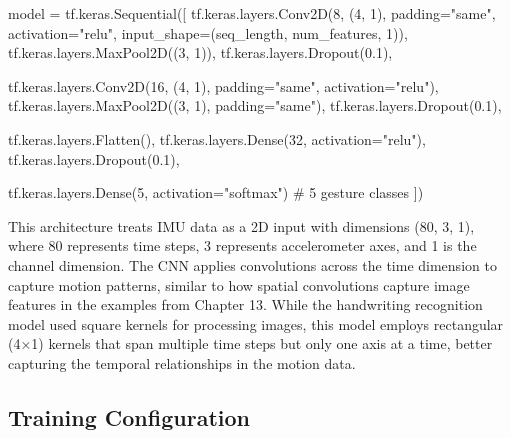 \documentclass[
  9pt,
  letterpaper,
  abstract,
  titlepage]{scrbook}
\newenvironment{Shaded}{\begin{snugshade}}{\end{snugshade}}
\newcommand{\CommentTok}[1]{\textcolor[rgb]{0.37,0.37,0.37}{#1}}
\newcommand{\DecValTok}[1]{\textcolor[rgb]{0.68,0.00,0.00}{#1}}
\newcommand{\FloatTok}[1]{\textcolor[rgb]{0.68,0.00,0.00}{#1}}
\newcommand{\NormalTok}[1]{\textcolor[rgb]{0.00,0.23,0.31}{#1}}
\newcommand{\OperatorTok}[1]{\textcolor[rgb]{0.37,0.37,0.37}{#1}}
\newcommand{\StringTok}[1]{\textcolor[rgb]{0.13,0.47,0.30}{#1}}
\begin{document}
\begin{Shaded}
\begin{Highlighting}[]
\NormalTok{model }\OperatorTok{=}\NormalTok{ tf.keras.Sequential([}
\NormalTok{    tf.keras.layers.Conv2D(}\DecValTok{8}\NormalTok{, (}\DecValTok{4}\NormalTok{, }\DecValTok{1}\NormalTok{), padding}\OperatorTok{=}\StringTok{"same"}\NormalTok{, activation}\OperatorTok{=}\StringTok{"relu"}\NormalTok{,}
\NormalTok{                           input\_shape}\OperatorTok{=}\NormalTok{(seq\_length, num\_features, }\DecValTok{1}\NormalTok{)),}
\NormalTok{    tf.keras.layers.MaxPool2D((}\DecValTok{3}\NormalTok{, }\DecValTok{1}\NormalTok{)),}
\NormalTok{    tf.keras.layers.Dropout(}\FloatTok{0.1}\NormalTok{),}

\NormalTok{    tf.keras.layers.Conv2D(}\DecValTok{16}\NormalTok{, (}\DecValTok{4}\NormalTok{, }\DecValTok{1}\NormalTok{), padding}\OperatorTok{=}\StringTok{"same"}\NormalTok{, activation}\OperatorTok{=}\StringTok{"relu"}\NormalTok{),}
\NormalTok{    tf.keras.layers.MaxPool2D((}\DecValTok{3}\NormalTok{, }\DecValTok{1}\NormalTok{), padding}\OperatorTok{=}\StringTok{"same"}\NormalTok{),}
\NormalTok{    tf.keras.layers.Dropout(}\FloatTok{0.1}\NormalTok{),}

\NormalTok{    tf.keras.layers.Flatten(),}
\NormalTok{    tf.keras.layers.Dense(}\DecValTok{32}\NormalTok{, activation}\OperatorTok{=}\StringTok{"relu"}\NormalTok{),}
\NormalTok{    tf.keras.layers.Dropout(}\FloatTok{0.1}\NormalTok{),}

\NormalTok{    tf.keras.layers.Dense(}\DecValTok{5}\NormalTok{, activation}\OperatorTok{=}\StringTok{"softmax"}\NormalTok{)  }\CommentTok{\# 5 gesture classes}
\NormalTok{])}
\end{Highlighting}
\end{Shaded}

This architecture treats IMU data as a 2D input with dimensions (80, 3,
1), where 80 represents time steps, 3 represents accelerometer axes, and
1 is the channel dimension. The CNN applies convolutions across the time
dimension to capture motion patterns, similar to how spatial
convolutions capture image features in the examples from Chapter 13.
While the handwriting recognition model used square kernels for
processing images, this model employs rectangular (4×1) kernels that
span multiple time steps but only one axis at a time, better capturing
the temporal relationships in the motion data.

\subsection{Training Configuration}\label{training-configuration-1}
\end{document}
